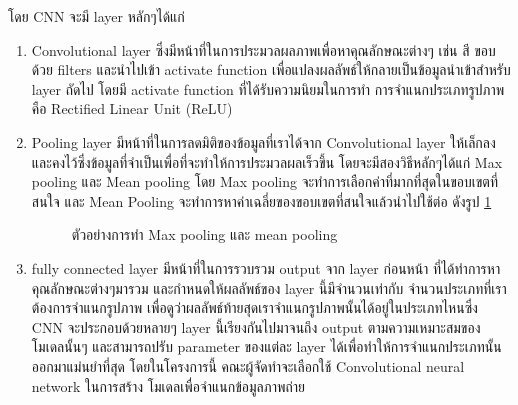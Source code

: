 \documentclass[12pt,oneside,openright,a4paper]{cpe-thai-project}
\begin{document}
โดย CNN จะมี layer หลักๆได้แก่ 	
\begin{enumerate}
  \item Convolutional layer ซึ่งมีหน้าที่ในการประมวลผลภาพเพื่อหาคุณลักษณะต่างๆ เช่น สี ขอบ ด้วย filters และนำไปเข้า activate function เพื่อแปลงผลลัพธ์ให้กลายเป็นข้อมูลนำเข้าสำหรับ layer ถัดไป 
  โดยมี activate function ที่ได้รับความนิยมในการทำ การจำแนกประเภทรูปภาพ คือ Rectified Linear Unit (ReLU)
  \item Pooling layer มีหน้าที่ในการลดมิติของข้อมูลที่เราได้จาก Convolutional layer ให้เล็กลง และคงไว้ซึ่งข้อมูลที่จำเป็นเพื่อที่จะทำให้การประมวลผลเร็วขึ้น โดยจะมีสองวิธีหลักๆได้แก่ 
  Max pooling และ Mean pooling โดย Max pooling จะทำการเลือกค่าที่มากที่สุดในขอบเขตที่สนใจ และ Mean Pooling จะทำการหาค่าเฉลี่ยของขอบเขตที่สนใจแล้วนำไปใช้ต่อ ดังรูป \ref{fig:pooling} 
  \begin{figure}[H]\centering
    \setlength{\fboxrule}{0.2mm} %
    \setlength{\fboxsep}{1cm}
    \caption{ตัวอย่างการทำ Max pooling และ mean pooling}\label{fig:pooling}
  \end{figure}
  \item fully connected layer มีหน้าที่ในการรวบรวม output จาก layer ก่อนหน้า ที่ได้ทำการหา คุณลักษณะต่างๆมารวม และกำหนดให้ผลลัพธ์ของ layer นี้มีจำนวนเท่ากับ จำนวนประเภทที่เราต้องการจำแนกรูปภาพ 
  เพื่อดูว่าผลลัพธ์ท้ายสุดเราจำแนกรูปภาพนั้นได้อยู่ในประเภทไหนซึ่ง CNN จะประกอบด้วยหลายๆ layer นี้เรียงกันไปมาจนถึง output ตามความเหมาะสมของ โมเดลนั้นๆ และสามารถปรับ parameter ของแต่ละ layer ได้เพื่อทำให้การจำแนกประเภทนั้นออกมาแม่นยำที่สุด 
  โดยในโครงการนี้ คณะผู้จัดทำจะเลือกใช้ Convolutional neural network ในการสร้าง โมเดลเพื่อจำแนกข้อมูลภาพถ่าย
\end{enumerate}
\end{document}
